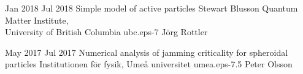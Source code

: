 \documentclass[letterpaper]{cvtemplate_en} %
\begin{document}
\begin{cvbody}
\cvitem
	{Jan 2018}
	{Jul 2018}
  {Simple model of active particles}
  {Stewart Blusson Quantum Matter Institute,\\ University of British Columbia }
  {ubc.eps}{}{-7}
  {J\"org Rottler}
  {\\
  }

\cvitem
	{May 2017}
	{Jul 2017}
	{Numerical analysis of jamming criticality for spheroidal particles}
	{Institutionen f\"{o}r fysik, Ume\r{a} universitet }
	{umea.eps}{}{-7.5}
	{Peter Olsson}
	{\\
	}


\end{cvbody}
\end{document}
